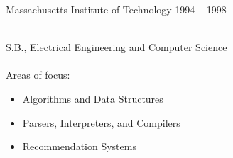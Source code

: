 \documentclass[10pt]{article}
\begin{document}

\spacedhrule{0.8em}{-0.4em}


\headedsection
  {Massachusetts Institute of Technology}
  {1994 -- 1998}
  {\\S.B., Electrical Engineering and Computer Science
   \\
   \\Areas of focus:
   \begin{itemize}
   \item Algorithms and Data Structures
   \item Parsers, Interpreters, and Compilers
   \item Recommendation Systems
\end{itemize}}
\end{document}
